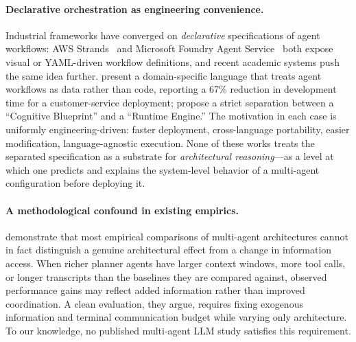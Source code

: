 \documentclass[11pt]{article}
\begin{document}
\paragraph{Declarative orchestration as engineering convenience.}
Industrial frameworks have converged on \emph{declarative} specifications of agent workflows: AWS Strands~\citep{strands2025} and Microsoft Foundry Agent Service~\citep{foundry2026} both expose visual or YAML-driven workflow definitions, and recent academic systems push the same idea further. \citet{daunis2025declarative} present a domain-specific language that treats agent workflows as data rather than code, reporting a 67\% reduction in development time for a customer-service deployment; \citet{auton2026} propose a strict separation between a ``Cognitive Blueprint'' and a ``Runtime Engine.'' The motivation in each case is uniformly engineering-driven: faster deployment, cross-language portability, easier modification, language-agnostic execution. None of these works treats the separated specification as a substrate for \emph{architectural reasoning}---as a level at which one predicts and explains the system-level behavior of a multi-agent configuration before deploying it.

\paragraph{A methodological confound in existing empirics.}
\citet{reliability2026} demonstrate that most empirical comparisons of multi-agent architectures cannot in fact distinguish a genuine architectural effect from a change in information access. When richer planner agents have larger context windows, more tool calls, or longer transcripts than the baselines they are compared against, observed performance gains may reflect added information rather than improved coordination. A clean evaluation, they argue, requires fixing exogenous information and terminal communication budget while varying only architecture. To our knowledge, no published multi-agent LLM study satisfies this requirement.
\end{document}
